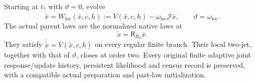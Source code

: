 Starting at $t_*$ with $\vartheta=0$, evolve
\begin{equation}
 \dot{\bar x}=W_{\mathrm{loc}}(\bar x,c,h)
 :=V(\bar x,c,h)-\omega_{\mathrm{loc}}\mathcal J\bar x,
 \qquad \dot\vartheta=\omega_{\mathrm{loc}}.
 \label{lp:causal-system}
\end{equation}
The actual parent laws are the normalized native laws at
\begin{equation}
 \widetilde x=\mathsf R_{R_\vartheta}\bar x.
 \label{lp:causal-readout}
\end{equation}
They satisfy $\dot{\widetilde x}=V(\widetilde x,c,h)$ on every regular finite branch. Their local two-jet, together with that of $\vartheta$, closes at order two. Every original finite adaptive joint response/update history, persistent likelihood and census record is preserved, with a compatible actual preparation and past-law initialization.
